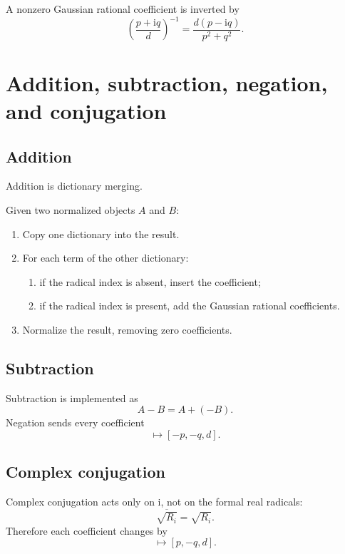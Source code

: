 \documentclass[11pt]{article}
\newcommand{\ii}{\mathrm{i}}
\begin{document}
A nonzero Gaussian rational coefficient is inverted by
\begin{equation}
  \left(\frac{p+\ii q}{d}\right)^{-1}
  = \frac{d(p-\ii q)}{p^2+q^2}.
\end{equation}

\section{Addition, subtraction, negation, and conjugation}

\subsection{Addition}

Addition is dictionary merging.

Given two normalized objects \(A\) and \(B\):
\begin{enumerate}[label=\alph*)]
  \item Copy one dictionary into the result.
  \item For each term of the other dictionary:
  \begin{enumerate}[label=\roman*)]
    \item if the radical index is absent, insert the coefficient;
    \item if the radical index is present, add the Gaussian rational coefficients.
  \end{enumerate}
  \item Normalize the result, removing zero coefficients.
\end{enumerate}

\subsection{Subtraction}

Subtraction is implemented as
\begin{equation}
  A-B = A+(-B).
\end{equation}
Negation sends every coefficient
\begin{equation}
  [p,q,d]\mapsto [-p,-q,d].
\end{equation}

\subsection{Complex conjugation}

Complex conjugation acts only on \(\ii\), not on the formal real radicals:
\begin{equation}
  \overline{\sqrt{R_i}}=\sqrt{R_i}.
\end{equation}
Therefore each coefficient changes by
\begin{equation}
  [p,q,d]\mapsto [p,-q,d].
\end{equation}
\end{document}
